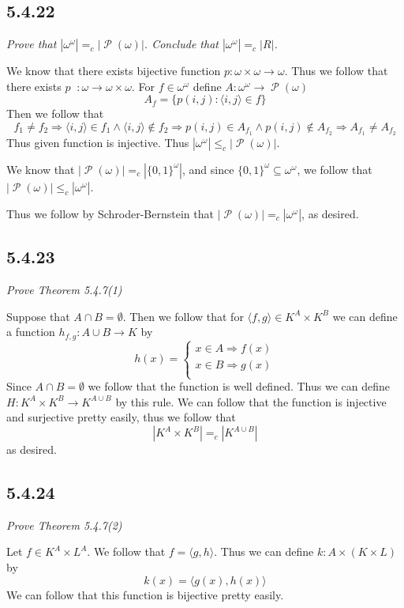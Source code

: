 \documentclass[11pt,oneside,titlepage]{book}
\DeclareMathOperator \pow {\mathcal {P}}
\DeclareMathOperator \inv {^{-1}}
\DeclareMathOperator \ra {\Rightarrow}
\newcommand{\eangle}[1]{\langle #1 \rangle}
\begin{document}
\subsection*{5.4.22}

\textit{Prove that $|\omega^\omega| =_c |\pow(\omega)|$. Conclude that $|\omega^\omega| =_c |R|$.}

We know that there exists bijective function $p: \omega \times \omega \to \omega$. Thus we
follow that there exists $p \inv: \omega \to \omega \times \omega$. For $f \in
\omega^\omega$ define $A: \omega^\omega \to \pow(\omega)$
$$A_f = \{p(i, j): \eangle{i, j} \in f\}$$
Then we follow that
$$f_1 \neq f_2 \ra \eangle{i, j} \in f_1 \land \eangle{i, j} \notin f_2 \ra
p(i, j) \in A_{f_1} \land p(i, j) \notin  A_{f_2} \ra A_{f_1} \neq A_{f_2}$$
Thus given function is injective. Thus $ |\omega^\omega|  \leq_c |\pow(\omega)|$.

We know that $|\pow(\omega)| =_c |\{0, 1\}^{\omega}|$, and since
$\{0, 1\}^{\omega} \subseteq \omega^\omega$, we follow that $|\pow(\omega)| \leq_c |\omega^\omega|$.

Thus we follow by Schroder-Bernstein that $|\pow(\omega)| =_c |\omega^\omega|$, as desired.

\subsection*{5.4.23}

\textit{Prove Theorem 5.4.7(1)}

Suppose that $A \cap B = \emptyset$. Then we follow that for $\eangle{f, g} \in K^A \times K^B$
we can define a function $h_{f, g}: A \cup B \to K$ by
$$
h(x) =
\begin{cases}
  x \in A \ra f(x) \\
  x \in B  \ra g(x) \\
\end{cases}
$$
Since $A \cap B = \emptyset$ we follow that the function is well defined.
Thus we can define $H: K^A \times K^B \to K^{A \cup B}$ by this rule.
We can follow that the function is injective and surjective pretty easily, thus we follow that
$$|K^A \times K^B| =_c |K^{A \cup B}|$$
as desired.

\subsection*{5.4.24}

\textit{Prove Theorem 5.4.7(2)}

Let $f \in K^A \times L^A$. We follow that $f = \eangle{g, h}$. Thus we can define
$k: A \times (K \times L)$ by
$$k(x) = \eangle{g(x), h(x)}$$
We can follow that this function is bijective pretty easily.
\end{document}
